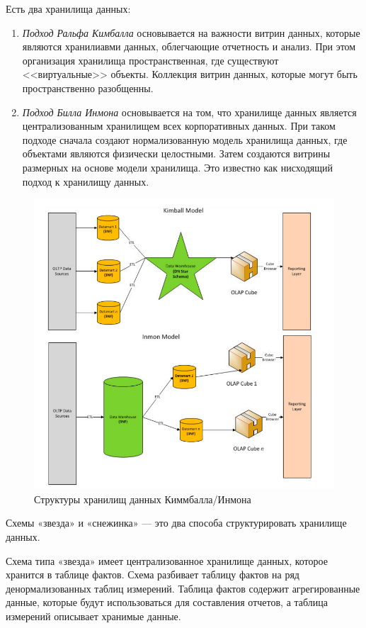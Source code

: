 Есть два хранилища данных:
\begin{enumerate}
	\item \textit{Подход Ральфа Кимбалла} основывается на важности витрин данных, которые являются хранилиавми данных, облегчающие отчетность и анализ. При этом организация хранилища пространственная, где существуют <<виртуальные>> объекты. Коллекция витрин данных, которые могут быть пространственно разобщенны.
	\item \textit{Подход Билла Инмона} основывается на том, что хранилище данных является централизованным хранилищем всех корпоративных данных. При таком подходе сначала создают нормализованную модель хранилища данных, где объектами являются физически целостными. Затем создаются витрины размерных на основе модели хранилища. Это известно как нисходящий подход к хранилищу данных.
\end{enumerate}

\begin{figure}[h]
	\centering
	\includegraphics[width=18cm, keepaspectratio]{assets/db-places.png}
	\caption{Структуры хранилищ данных Киммбалла/Инмона} 
\end{figure}

Схемы «звезда» и «снежинка» — это два способа структурировать хранилище данных.

Схема типа «звезда» имеет централизованное хранилище данных, которое хранится в таблице фактов. Схема разбивает таблицу фактов на ряд денормализованных таблиц измерений. Таблица фактов содержит агрегированные данные, которые будут использоваться для составления отчетов, а таблица измерений описывает хранимые данные. 

